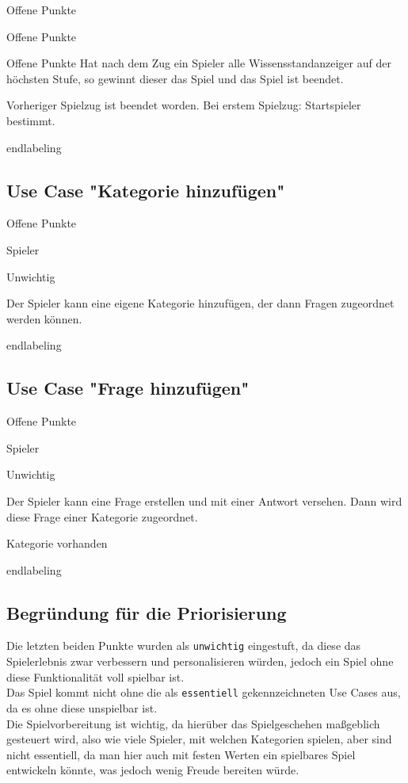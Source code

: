 \begin{labeling}[:]{Offene Punkte}
\begin{labeling}[:]{Offene Punkte}
\begin{labeling}[:]{Offene Punkte}
Hat nach dem Zug ein Spieler alle Wissensstandanzeiger auf der höchsten Stufe, so gewinnt dieser das Spiel und das Spiel ist beendet.
\item [Vorbedigungen] Vorheriger Spielzug ist beendet worden. Bei erstem Spielzug: Startspieler bestimmt.
\item [Offene Punkte]
\end{labeling}end{labeling}

\subsection{Use Case "Kategorie hinzufügen"}
\begin{labeling}[:]{Offene Punkte}
\item [Akteure] Spieler
\item [Priorität] Unwichtig
\item [Beschreibung] Der Spieler kann eine eigene Kategorie hinzufügen, der dann Fragen zugeordnet werden können.
\item [Vorbedigungen]
\item [Offene Punkte]
\end{labeling}end{labeling}

\subsection{Use Case "Frage hinzufügen"}
\begin{labeling}[:]{Offene Punkte}
\item [Akteure] Spieler
\item [Priorität] Unwichtig
\item [Beschreibung] Der Spieler kann eine Frage erstellen und mit einer Antwort versehen. Dann wird diese Frage einer Kategorie zugeordnet.
\item [Vorbedigungen] Kategorie vorhanden
\item [Offene Punkte]
\end{labeling}end{labeling}

\subsection{Begründung für die Priorisierung}\label{sec:begruendung-prio}

Die letzten beiden Punkte wurden als \texttt{unwichtig} eingestuft, da diese das Spielerlebnis zwar verbessern und personalisieren würden, jedoch ein Spiel ohne diese Funktionalität voll spielbar ist.\\
Das Spiel kommt nicht ohne die als \texttt{essentiell} gekennzeichneten Use Cases aus, da es ohne diese unspielbar ist.\\
Die Spielvorbereitung ist wichtig, da hierüber das Spielgeschehen maßgeblich gesteuert wird, also wie viele Spieler, mit welchen Kategorien spielen, aber sind nicht essentiell, da man hier auch mit festen Werten ein spielbares Spiel entwickeln könnte, was jedoch wenig Freude bereiten würde.


\end{labeling}
\end{labeling}
